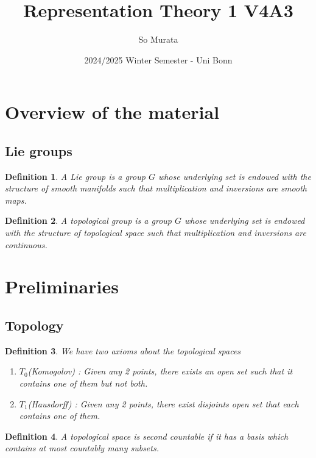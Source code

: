 \documentclass{article}
\title{Representation Theory 1 V4A3}
\author{So Murata}
\date{2024/2025 Winter Semester - Uni Bonn}
\newtheorem{definition}{Definition}[section]
\numberwithin{equation}{section}
\begin{document}
\maketitle



\section{Overview of the material}

\subsection{Lie groups}

\begin{definition}
A Lie group is a group $G$ whose underlying set is endowed with the structure of smooth manifolds such that multiplication and inversions are smooth maps.
\end{definition}

\begin{definition}
A topological group is a group $G$ whose underlying set is endowed with the structure of topological space such that multiplication and inversions are continuous.
\end{definition}

\section{Preliminaries}

\subsection{Topology}

\begin{definition}
We have two axioms about the topological spaces
\begin{enumerate}
\item $T_0$(Komogolov) : Given any 2 points, there exists an open set such that it contains one of them but not both.
\item $T_1$(Hausdorff) : Given any 2 points, there exist disjoints open set that each contains one of them.
\end{enumerate}
\end{definition}

\begin{definition}
A topological space is second countable if it has a basis which contains at most countably many subsets.
\end{definition}
\end{document}
